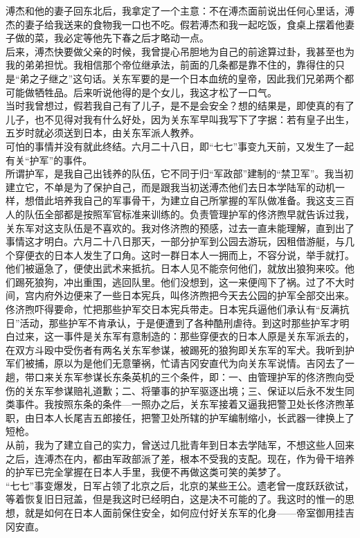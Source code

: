 溥杰和他的妻子回东北后，我拿定了一个主意：不在溥杰面前说出任何心里话，溥杰的妻子给我送来的食物我一口也不吃。假若溥杰和我一起吃饭，食桌上摆着他妻子做的菜，我必定等他先下春之后才略动一点。\\

后来，溥杰快要做父亲的时候，我曾提心吊胆地为自己的前途算过卦，我甚至也为我的弟弟担忧。我相信那个帝位继承法，前面的几条都是靠不住的，靠得住的只是“弟之子继之”这句话。关东军要的是一个日本血统的皇帝，因此我们兄弟两个都可能做牺牲品。后来听说他得的是个女儿，我这才松了一口气。\\

当时我曾想过，假若我自己有了儿子，是不是会安全？想的结果是，即使真的有了儿子，也不见得对我有什么好处，因为关东军早叫我写下了字据：若有皇子出生，五岁时就必须送到日本，由关东军派人教养。\\

可怕的事情并没有就此终结。六月二十八日，即“七七”事变九天前，又发生了一起有关“护军”的事件。\\

所谓护军，是我自己出钱养的队伍，它不同于归“军政部”建制的“禁卫军”。我当初建立它，不单是为了保护自己，而是跟我当初送溥杰他们去日本学陆军的动机一样，想借此培养我自己的军事骨干，为建立自己所掌握的军队做准备。我这支三百人的队伍全部都是按照军官标准来训练的。负责管理护军的佟济煦早就告诉过我，关东军对这支队伍是不喜欢的。我对佟济煦的预感，过去一直未能理解，直到出了事情这才明白。六月二十八日那天，一部分护军到公园去游玩，因租借游艇，与几个穿便衣的日本人发生了口角。这时一群日本人一拥而上，不容分说，举手就打。他们被逼急了，便使出武术来抵抗。日本人见不能奈何他们，就放出狼狗来咬。他们踢死狼狗，冲出重围，逃回队里。他们没想到，这一来便闯下了祸。过了不大时间，宫内府外边便来了一些日本宪兵，叫佟济煦把今天去公园的护军全部交出来。佟济煦吓得要命，忙把那些护军交日本宪兵带走。日本宪兵逼他们承认有“反满抗日”活动，那些护军不肯承认，于是便遭到了各种酷刑虐待。到这时那些护军才明白过来，这一事件是关东军有意制造的：那些穿便衣的日本人原是关东军派去的，在双方斗殴中受伤者有两名关东军参谋，被踢死的狼狗即关东军的军犬。我听到护军们被捕，原以为是他们无意肇祸，忙请吉冈安直代为向关东军说情。吉冈去了一趟，带口来关东军参谋长东条英机的三个条件，即：一、由管理护军的佟济煦向受伤的关东军参谋赔礼道歉；二、将肇事的护军驱逐出境；三、保证以后永不发生同类事件。我按照东条的条件—一照办之后，关东军接着又逼我把警卫处长佟济煦革职，由日本人长尾吉五郎接任，把警卫处所辖的护军编制缩小，长武器一律换上了短枪。\\

从前，我为了建立自己的实力，曾送过几批青年到日本去学陆军，不想这些人回来之后，连溥杰在内，都由军政部派了差，根本不受我的支配。现在，作为骨干培养的护军已完全掌握在日本人手里，我便不再做这类可笑的美梦了。\\

“七七”事变爆发，日军占领了北京之后，北京的某些王公。遗老曾一度跃跃欲试，等着恢复旧日冠盖，但是我这时已经明白，这是决不可能的了。我这时的惟一的思想，就是如何在日本人面前保住安全，如何应付好关东军的化身——帝室御用挂吉冈安直。\\